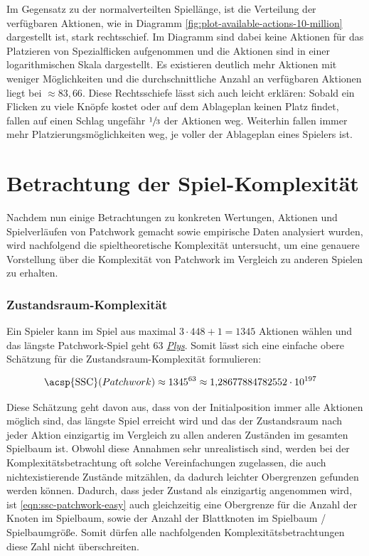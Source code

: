 Im Gegensatz zu der normalverteilten Spiellänge, ist die Verteilung der verfügbaren Aktionen, wie in Diagramm \ref{fig:plot-available-actions-10-million} dargestellt ist, stark rechtsschief. Im Diagramm sind dabei keine Aktionen für das Platzieren von Spezialflicken aufgenommen und die Aktionen sind in einer logarithmischen Skala dargestellt. Es existieren deutlich mehr Aktionen mit weniger Möglichkeiten und die durchschnittliche Anzahl an verfügbaren Aktionen liegt bei ${\approx}83{,}66$. Diese Rechtsschiefe lässt sich auch leicht erklären: Sobald ein Flicken zu viele Knöpfe kostet oder auf dem Ablageplan keinen Platz findet, fallen auf einen Schlag ungefähr $\sfrac{1}{3}$ der Aktionen weg. Weiterhin fallen immer mehr Platzierungsmöglichkeiten weg, je voller der Ablageplan eines Spielers ist.

\section{Betrachtung der Spiel-Komplexität}
\label{section:betrachtung-der-spiel-komplexitaet}

Nachdem nun einige Betrachtungen zu konkreten Wertungen, Aktionen und Spielverläufen von Patchwork gemacht sowie empirische Daten analysiert wurden, wird nachfolgend die spieltheoretische Komplexität untersucht, um eine genauere Vorstellung über die Komplexität von Patchwork im Vergleich zu anderen Spielen zu erhalten.

\subsubsection*{Zustandsraum-Komplexität}
\label{subsection:zustandsraum-komplexitaet}

Ein Spieler kann im Spiel aus maximal $3 \cdot 448 + 1 = 1345$ Aktionen wählen und das längste Patchwork-Spiel geht 63 \hyperref[text:ply]{\emph{Plys}}. Somit lässt sich eine einfache obere Schätzung für die Zustandsraum-Komplexität formulieren:

\begin{align}
    \label{eqn:ssc-patchwork-easy}
    \text{\acsp{SSC}}(Patchwork) & \approx 1345^{63} \approx 1{,}28677884782552 \cdot 10^{197}
\end{align}

Diese Schätzung geht davon aus, dass von der Initialposition immer alle Aktionen möglich sind, das längste Spiel erreicht wird und das der Zustandsraum nach jeder Aktion einzigartig im Vergleich zu allen anderen Zuständen im gesamten Spielbaum ist. Obwohl diese Annahmen sehr unrealistisch sind, werden bei der Komplexitätsbetrachtung oft solche Vereinfachungen zugelassen, die auch nichtexistierende Zustände mitzählen, da dadurch leichter Obergrenzen gefunden werden können. Dadurch, dass jeder Zustand als einzigartig angenommen wird, ist \ref{eqn:ssc-patchwork-easy} auch gleichzeitig eine Obergrenze für die Anzahl der Knoten im Spielbaum, sowie der Anzahl der Blattknoten im Spielbaum / Spielbaumgröße. Somit dürfen alle nachfolgenden Komplexitätsbetrachtungen diese Zahl nicht überschreiten.

